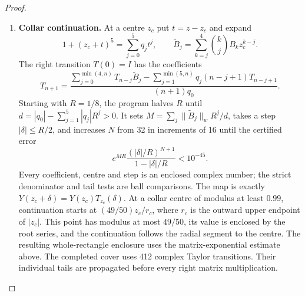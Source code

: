 \begin{proof}
\begin{enumerate}[label={$\langle1\rangle$\arabic*.}]
\begin{enumerate}[label={$\langle2\rangle$\arabic*.},leftmargin=*]
\item \textbf{Collar continuation.}
At a centre $z_c$ put $t=z-z_c$ and expand
\[
 1+(z_c+t)^5=\sum_{j=0}^5q_jt^j,\qquad
 \widetilde B_j=\sum_{k=j}^4\binom kjB_kz_c^{k-j}.
\]
The right transition $T(0)=I$ has the coefficients
\[
 T_{n+1}=\frac{\displaystyle
 \sum_{j=0}^{\min(4,n)}T_{n-j}\widetilde B_j
 -\sum_{j=1}^{\min(5,n)}q_j(n-j+1)T_{n-j+1}}
 {(n+1)q_0}.
\]
Starting with $R=1/8$, the program halves $R$ until
$d=|q_0|-\sum_{j=1}^5|q_j|R^j>0$.
It sets $M=\sum_j\|\widetilde B_j\|_wR^j/d$, takes a step
$|\delta|\le R/2$, and increases $N$ from 32 in increments of 16
until the certified error
\[
 e^{MR}\frac{(|\delta|/R)^{N+1}}{1-|\delta|/R}<10^{-45}.
\]
Every coefficient, centre and step is an enclosed complex number;
the strict denominator and tail tests are ball comparisons.
The map is exactly $Y(z_c+\delta)=Y(z_c)T_{z_c}(\delta)$.
At a collar centre of modulus at least $0.99$, continuation starts
at $(49/50)z_c/r_c$, where $r_c$ is the outward upper endpoint
of $|z_c|$. This point has modulus at most $49/50$, its value is
enclosed by the root series, and the continuation follows the
radial segment to the centre.  The resulting
whole-rectangle enclosure uses the matrix-exponential estimate above.
The completed cover uses 412 complex Taylor transitions.  Their individual tails are propagated before every right
matrix multiplication.


\end{enumerate}
\end{enumerate}
\end{proof}
